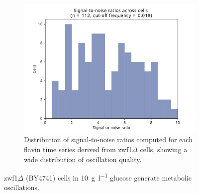 \begin{figure}
  \begin{subfigure}[t]{0.45\textwidth}
   \centering
   \includegraphics[width=\textwidth]{zwf1egf_409_10.pdf}
   \caption{
    Distribution of signal-to-noise ratios computed for each flavin time series derived from zwf1$\Delta$ cells, showing a wide distribution of oscillation quality.
   }
   \label{fig:biology-zwf1-snr}
  \end{subfigure}%

  \caption{
    zwf1$\Delta$ (BY4741) cells in \SI{10}{\gram~\litre^{-1}} glucose generate metabolic oscillations.
  }
  \label{fig:biology-zwf1}
\end{figure}


